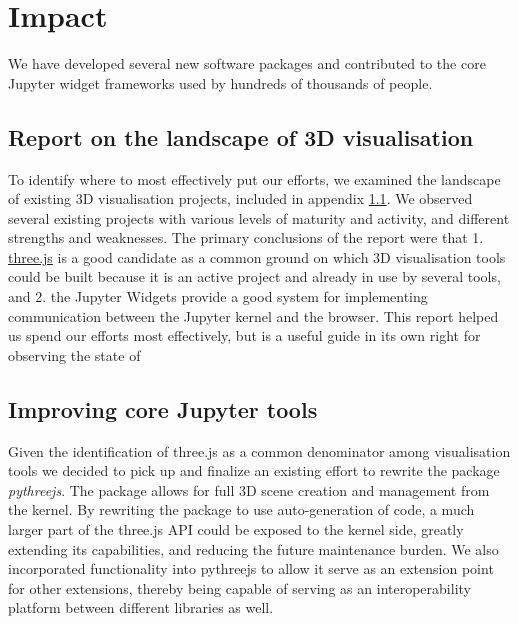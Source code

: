 \documentclass{deliverablereport}
\begin{document}

\section{Impact}

We have developed several new software packages and contributed to the core Jupyter widget frameworks used by hundreds of thousands of people.

\subsection{Report on the landscape of 3D visualisation}\label{landscape}

To identify where to most effectively put our efforts,
we examined the landscape of existing 3D visualisation projects,
included in appendix \ref{landscape}.
We observed several existing projects with various levels of maturity and activity, and different strengths and weaknesses.
The primary conclusions of the report were that 1. \href{https://threejs.org}{three.js} is a good candidate as a common ground on which 3D visualisation tools could be built because it is an active project and already in use by several tools, and 2. the Jupyter Widgets provide a good system for implementing communication between the Jupyter kernel and the browser.
This report helped us spend our efforts most effectively,
but is a useful guide in its own right for observing the state of


\subsection{Improving core Jupyter tools}\label{improving-core}


Given the identification of three.js as a common denominator among visualisation tools
we decided to pick up and finalize an existing effort to rewrite the package
\emph{pythreejs}. The package allows for full 3D scene creation and management from the
kernel. By rewriting the package to use auto-generation of code, a much larger
part of the three.js API could be exposed to the kernel side, greatly extending
its capabilities, and reducing the future maintenance burden. We also incorporated
functionality into pythreejs to allow it serve as an extension
point for other extensions, thereby being capable of serving as an interoperability
platform between different libraries as well.
\end{document}
